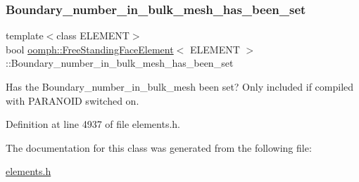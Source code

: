 \subsubsection{\texorpdfstring{Boundary\+\_\+number\+\_\+in\+\_\+bulk\+\_\+mesh\+\_\+has\+\_\+been\+\_\+set}{Boundary\_number\_in\_bulk\_mesh\_has\_been\_set}}
{\footnotesize\ttfamily template$<$class E\+L\+E\+M\+E\+NT$>$ \\
bool \hyperlink{classoomph_1_1FreeStandingFaceElement}{oomph\+::\+Free\+Standing\+Face\+Element}$<$ E\+L\+E\+M\+E\+NT $>$\+::Boundary\+\_\+number\+\_\+in\+\_\+bulk\+\_\+mesh\+\_\+has\+\_\+been\+\_\+set\hspace{0.3cm}{\ttfamily [protected]}}



Has the Boundary\+\_\+number\+\_\+in\+\_\+bulk\+\_\+mesh been set? Only included if compiled with P\+A\+R\+A\+N\+O\+ID switched on. 



Definition at line 4937 of file elements.\+h.



The documentation for this class was generated from the following file\+:\begin{DoxyCompactItemize}
\item 
\hyperlink{elements_8h}{elements.\+h}\end{DoxyCompactItemize}
